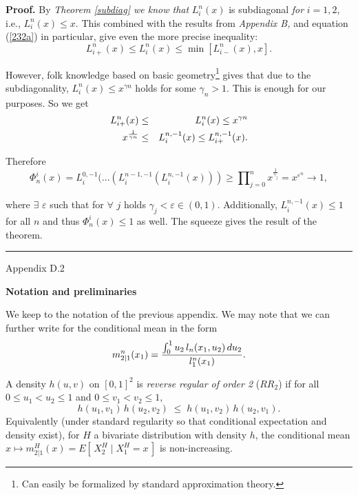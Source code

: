 \documentclass[onecolumn]{article}
\newtheorem{definition}[theorem]{Definition}
\let\olddefinition\definition
\let\endolddefinition\enddefinition
\renewenvironment{definition}{\olddefinition\normalfont}{\endolddefinition}
\newenvironment{proof}[1][Proof]{\noindent\textbf{#1.} }{\ \rule{0.5em}{0.5em}}
\begin{document}
\begin{proof}
By \textit{Theorem \ref{subdiag} we know that }$L_{i}^{n}(x)$ is subdiagonal 
\textit{for }$i=1,2$, i.e., $L_{i}^{n}(x)\leq x$. This combined with the
results from \textit{Appendix B,} and equation (\ref{232a}) in particular,
give even the more precise inequality:%
\begin{equation}
L_{i+}^{n}(x)\leq L_{i}^{n}(x)\leq \min [L_{i-}^{n}(x),x].  \label{402}
\end{equation}

However, folk knowledge based on basic geometry\footnote{{\footnotesize Can
easily be formalized by standard approximation theory.}} gives that due to
the subdiagonality, $L_{i}^{n}(x)\leq x^{\gamma n}$ holds for some $\gamma
_{n}>1$. This is enough for our purposes. So we get%
\begin{eqnarray}
L_{i+}^{n}(x) &\leq &L_{i}^{n}(x)\leq x^{\gamma n}  \label{403} \\
x^{\frac{1}{\gamma n}} &\leq &L_{i}^{n,-1}(x)\leq L_{i+}^{n,-1}(x).  \notag
\end{eqnarray}

Therefore%
\begin{equation}
\Phi _{n}^{i}(x)=L_{i}^{0,-1}(...(L_{i}^{n-1,-1}(L_{i}^{n,-1}(x)))\geq
\prod\nolimits_{j=0}^{n}x^{\frac{1}{\gamma _{j}}}=x^{\varepsilon
^{n}}\rightarrow 1,  \label{404}
\end{equation}

where $\exists $ $\varepsilon $ such that for $\forall $ $j$ holds $\gamma
_{j}<\varepsilon \in (0,1).$ Additionally, $L_{i}^{n,-1}(x)\leq 1$ for all $%
n $ and thus $\Phi _{n}^{i}(x)\leq 1$ as well$.$ The squeeze gives the
result of the theorem.
\end{proof}

\begin{flushleft}
{\large Appendix D.2}

\textbf{Notation and preliminaries}
\end{flushleft}

We keep to the notation of the previous appendix. We may note that we can
further write for the conditional mean in the form 
\begin{equation}
m_{2\mid 1}^{n}(x_{1})=\frac{\int_{0}^{1}u_{2}\,l_{n}(x_{1},u_{2})\,du_{2}}{%
l_{1}^{n}(x_{1})}.  \label{321}
\end{equation}

\begin{definition}
\label{def-rr2} A density $h(u,v)$ on $[0,1]^{2}$ is \textit{reverse regular
of order 2} ($RR_{2}$) if for all $0\leq u_{1}<u_{2}\leq 1$ and $0\leq
v_{1}<v_{2}\leq 1$, 
\begin{equation}
h(u_{1},v_{1})\,h(u_{2},v_{2})\;\leq \;h(u_{1},v_{2})\,h(u_{2},v_{1}).
\label{322}
\end{equation}%
Equivalently (under standard regularity so that conditional expectation and
density exist), for $H$ a bivariate distribution with density $h$, the
conditional mean $x\mapsto m_{2|1}^{H}(x)=E[\,X_{2}^{H}\mid X_{1}^{H}=x\,]$
is non-increasing.
\end{definition}
\end{document}
